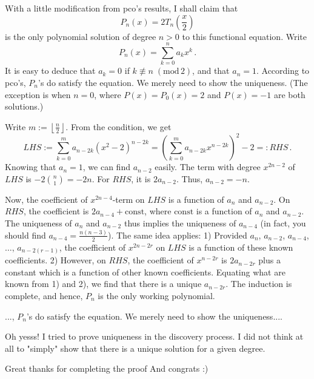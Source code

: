 \begin{solution}
	With a little modification from pco's results, I shall claim that
\[P_n(x) = 2T_n\left(\frac{x}{2}\right)\]
is the only polynomial solution of degree $n>0$ to this functional equation.  Write
\[P_n(x) = \sum_{k=0}^n a_k x^k\,.\]
It is easy to deduce that $a_k = 0$ if $k \not\equiv n \;(\mathrm{mod}\,2)$, and that $a_n=1$.  According to pco's, $P_n$'s do satisfy the equation.  We merely need to show the uniqueness.  (The exception is when $n=0$, where $P(x)=P_0(x)=2$ and $P(x) = -1$ are both solutions.)

Write $m:=\left\lfloor\frac{n}{2}\right\rfloor$.  From the condition, we get
\[LHS:=\sum_{k=0}^{m} a_{n-2k} \left(x^2-2\right)^{n-2k} = \left(\sum_{k=0}^m a_{n-2k} x^{n-2k}\right)^2-2=:RHS\,.\]
Knowing that $a_n=1$, we can find $a_{n-2}$ easily.  The term with degree $x^{2n-2}$ of $LHS$ is $-2\binom{n}{1}=-2n$.  For $RHS$, it is $2a_{n-2}$.  Thus, $a_{n-2}=-n$. 

Now, the coefficient of $x^{2n-4}$-term on $LHS$ is a function of $a_n$ and $a_{n-2}$.  On $RHS$, the coefficient is $2a_{n-4}+\mathrm{const}$, where $\mathrm{const}$ is a function of $a_n$ and $a_{n-2}$.  The uniqueness of $a_n$ and $a_{n-2}$ thus implies the uniqueness of $a_{n-4}$ (in fact, you should find $a_{n-4} = \frac{n(n-3)}{2}$).  The same idea applies:
1) Provided $a_n$, $a_{n-2}$, $a_{n-4}$, $\ldots$, $a_{n-2(r-1)}$, the coefficient of $x^{2n-2r}$ on $LHS$ is a function of these known coefficients.
2) However, on $RHS$, the coefficient of $x^{n-2r}$ is $2a_{n-2r}$ plus a constant which is a function of other known coefficients.
Equating what are known from 1) and 2), we find that there is a unique $a_{n-2r}$.  The induction is complete, and hence, $P_n$ is the only working polynomial.
\end{solution}



\begin{solution}
	\begin{tcolorbox}..., $P_n$'s do satisfy the equation.  We merely need to show the uniqueness....\end{tcolorbox}

Oh yesss! I tried to prove uniqueness in the discovery process.
I did not think at all to "simply" show that there is a unique solution for a given degree.

Great thanks for completing the proof
And congrats :)
\end{solution}



